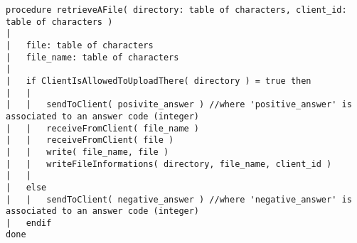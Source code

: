 \begin{lstlisting}
procedure retrieveAFile( directory: table of characters, client_id: table of characters )
|
|	file: table of characters
|	file_name: table of characters
|	
|	if ClientIsAllowedToUploadThere( directory ) = true then
|	|
|	|	sendToClient( posivite_answer ) //where 'positive_answer' is associated to an answer code (integer)
|	|	receiveFromClient( file_name )
|	|	receiveFromClient( file )
|	|	write( file_name, file )
|	|	writeFileInformations( directory, file_name, client_id )
|	|	
|	else
|	|	sendToClient( negative_answer ) //where 'negative_answer' is associated to an answer code (integer)
|	endif
done
\end{lstlisting}